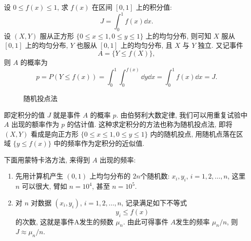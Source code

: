 \begin{example}\label{exam:4.2.1}
    设 $ 0 \leq f (x) \leq 1 $, 求 $ f (x) $ 在区间 $ [0, 1] $ 上的积分值:
    \begin{equation*}
        J = \int_0^1 f (x) \dd x.
    \end{equation*}
    设 $ (X,Y) $ 服从正方形 $ \{ 0 \leq x \leq 1, 0 \leq y \leq 1 \} $ 上的均匀分布, 则可知 $ X $ 服从 $ [ 0, 1 ] $ 上的均匀分布, $ Y $ 也服从 $ [ 0, 1 ] $ 上的均匀分布, 且 $ X $ 与 $ Y $ 独立.
    又记事件
    \begin{equation*}
        A = \{ Y \leq f (X) \},
    \end{equation*}
    则 $ A $ 的概率为
    \begin{equation*}
        p = P ( Y \leq f (x) ) = \int_0^1 \int_0^{f(x)} \dd y \dd x = \int_0^1 f (x) \dd x = J.
    \end{equation*}
    \begin{figure}[!ht]
      \centering
     \caption{随机投点法}
    \end{figure}
    即定积分的值 $ J $ 就是事件 $ A $ 的概率 $ p $.
    由伯努利大数定律, 我们可以用重复试验中 $ A $ 出现的额率作为 $ p $ 的估计值.
    这种求定积分的方法也称为随机投点法, 即将 $ (X, Y) $ 看成是向正方形 $ \{ 0 \leq x \leq 1, 0 \leq y \leq 1 \} $ 内的随机投点, 用随机点落在区域 $ \{ y \leq f (x) \} $ 中的频率作为定积分的近似值.

    下面用蒙特卡洛方法, 来得到 $ A $ 出现的频率:
    \begin{enumerate}
        \item 先用计算机产生 $ (0, 1) $ 上均匀分布的 $ 2n $个随机数: $ x_i, y_i $, $ i=1, 2, \dotsc, n$, 这里 $ n $ 可以很大, 臂如 $ n = 10^4 $, 甚至 $ n = 10^5 $.
        \item 对 $ n $ 对数据 $ (x_i, y_i) $, $ i=1, 2, \dotsc, n $, 记录满足如下不等式
        \begin{equation*}
            y_i \leq f (x)
        \end{equation*}
        的次数, 这就是事件A发生的频数 $ \mu_n $.
        由此可得事件 $ A $发生的频率 $ \mu_n / n $, 则 $ J \approx \mu_n / n $.
    \end{enumerate}


\end{example}
